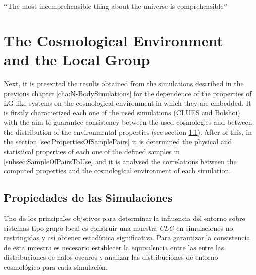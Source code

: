 \begin{savequote}[50mm]
‘‘The most incomprehensible thing about the universe is comprehensible’’
\end{savequote}




\chapter{The Cosmological Environment and the Local Group}
\label{cha:Results}


Next, it is presented the results obtained from the simulations described 
in the previous chapter \ref{cha:N-BodySimulations} for the dependence
of the properties of LG-like systems on the cosmological environment in 
which they are embedded. It is firstly characterized each one of the used
simulations (CLUES and Bolshoi) with the aim to guarantee consistency 
between the used cosmologies and between the distribution of the 
environmental properties (see section 
\ref{sec:StatisticalPropertiesOfAllSimulations}). After of this, in the 
section \ref{sec:PropertiesOfSamplePairs} it is determined the physical
and statistical properties of each one of the defined samples in
\ref{subsec:SampleOfPairsToUse} and it is analysed the correlations 
between the computed properties and the cosmological environment of each 
simulation.







\section{Propiedades de las Simulaciones}
\label{sec:StatisticalPropertiesOfAllSimulations}


Uno de los principales objetivos para determinar la influencia del entorno
sobre sistemas tipo grupo local es construir una muestra \textit{CLG} 
en simulaciones no res\-tringidas y así obtener estadística significativa. 
Para garantizar la consistencia de esta muestra es necesario
establecer la equivalencia entre las entre las distribuciones de halos 
oscuros y analizar las distribuciones de entorno cosmológico para cada 
simulación.


